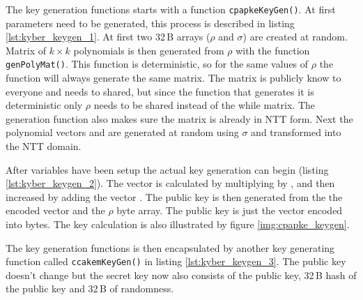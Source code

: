 The key generation functions starts with a function \texttt{cpapkeKeyGen()}. At first parameters need to be generated, this process is described in listing \ref{lst:kyber_keygen_1}. At first two 32\,B arrays ($\rho$ and $\sigma$) are created at random. Matrix  of $k\times k$ polynomials is then generated from $\rho$ with the function \texttt{genPolyMat()}. This function is deterministic, so for the same values of $\rho$ the function will always generate the same matrix. The matrix  is publicly know to everyone and needs to shared, but since the function that generates it is deterministic only $\rho$ needs to be shared instead of the while matrix. The generation function also makes sure the matrix is already in NTT form. Next the polynomial vectors  and  are generated at random using $\sigma$ and transformed into the NTT domain.

After variables have been setup the actual key generation can begin (listing \ref{lst:kyber_keygen_2}). The vector  is calculated by multiplying  by , and then increased by adding the vector . The public key is then generated from the the encoded vector  and the $\rho$ byte array. The public key is just the vector  encoded into bytes. The key calculation is also illustrated by figure \ref{img:cpapke_keygen}.
\newpage
{}

The key generation functions is then encapsulated by another key generating function called \texttt{ccakemKeyGen()} in listing \ref{lst:kyber_keygen_3}. The public key doesn't change but the secret key now also consists of the public key, 32\,B hash of the public key and 32\,B of randomness.

